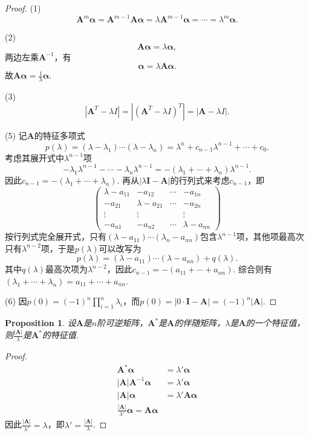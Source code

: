 \documentclass{article}
\newtheorem{proposition}[theorem]{Proposition}
\newcommand{\mbf}[1]{\bm{#1}}
\begin{document}
\begin{proof}
(1) 
$$
\mbf{A}^m \mbf{\alpha} = \mbf{A}^{m-1}\mbf{A}\mbf{\alpha} = \lambda  \mbf{A}^{m-1}\mbf{\alpha} = \cdots = \lambda^m \mbf{\alpha}. 
$$

(2)
$$
\mbf{A}\mbf{\alpha} = \lambda\mbf{\alpha}, 
$$
两边左乘$\mbf{A}^{-1}$，有
$$
\mbf{\alpha} = \lambda\mbf{A}\mbf{\alpha}.
$$
故$\mbf{A}\mbf{\alpha} = \frac{1}{\lambda}\mbf{\alpha}$.

(3)
$$
|\mbf{A}^T-\lambda I|= |(\mbf{A}^T-\lambda I)^T| = |\mbf{A}-\lambda I|.
$$

(5) 记$\mbf{A}$的特征多项式
$$
p(\lambda) = (\lambda-\lambda_1)\cdots(\lambda-\lambda_n) = \lambda^n + c_{n-1}\lambda^{n-1} + \cdots + c_0.
$$
考虑其展开式中$\lambda^{n-1}$项
$$
-\lambda_1\lambda^{n-1} - \cdots -\lambda_n\lambda^{n-1} = -(\lambda_1 + \cdots +\lambda_n)\lambda^{n-1}.
$$
因此$c_{n-1} = -(\lambda_1+ \cdots + \lambda_n)$. 再从$|\lambda\mbf{I}-\mbf{A}|$的行列式来考虑$c_{n-1}$，即
$$
\begin{pmatrix}
\lambda - a_{11} & -a_{12} & \cdots & -a_{1n} \\
-a_{21} & \lambda - a_{21} & \cdots & -a_{2n} \\
\vdots & \vdots && \vdots \\
-a_{n1} & -a_{n2} & \cdots & \lambda - a_{nn} 
\end{pmatrix}
$$
按行列式完全展开式，只有$(\lambda-a_{11})\cdots (\lambda_n - a_{nn})$包含$\lambda^{n-1}$项，其他项最高次只有$\lambda^{n-2}$项，于是$p(\lambda)$可以改写为
$$
p(\lambda) = (\lambda-a_{11})\cdots (\lambda - a_{nn}) + q(\lambda).
$$
其中$q(\lambda)$最高次项为$\lambda^{n-2}$，因此$c_{n-1}=-(a_{11} + \cdots + a_{nn})$. 综合则有$(\lambda_1+\cdots + \lambda_n) =  a_{11} + \cdots + a_{nn}$. 

(6) 因$p(0) = (-1)^n\prod\limits_{i=1}^n \lambda_i$，而$p(0)=|0\cdot \mbf{I}-\mbf{A}| = (-1)^n|\mbf{A}| $.
\end{proof}

\begin{proposition}
\rm 设$\mbf{A}$是$n$阶可逆矩阵，$\mbf{A}^*$是$\mbf{A}$的伴随矩阵，$\lambda$是$\mbf{A}$的一个特征值，则$\frac{|\mbf{A}|}{\lambda}$是$\mbf{A}^*$的特征值.
\end{proposition}

\begin{proof}
$$
\begin{array}{ll}
\mbf{A}^*\mbf{\alpha} &= \lambda'\mbf{\alpha} \\
|\mbf{A}|\mbf{A}^{-1}\mbf{\alpha} &= \lambda'\mbf{\alpha} \\
|\mbf{A}|\mbf{\alpha} &= \lambda' \mbf{A}\mbf{\alpha} \\
\frac{|\mbf{A}|}{\lambda'} \mbf{\alpha} = \mbf{A}\mbf{\alpha}
\end{array}
$$
因此$\frac{|\mbf{A}|}{\lambda'} = \lambda$，即$\lambda' = \frac{|\mbf{A}|}{\lambda}$.
\end{proof}
\end{document}
